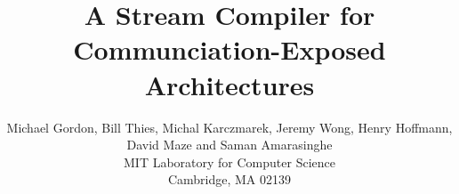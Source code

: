 
\title{A Stream Compiler for Communciation-Exposed Architectures}

\author{Michael Gordon, Bill Thies, Michal Karczmarek, Jeremy Wong,
        Henry Hoffmann, David Maze and Saman Amarasinghe\\
	MIT Laboratory for Computer Science\\
	Cambridge, MA  02139\\
	}


\sloppy




\maketitle

\begin{abstract}

\end{abstract}

%

%
%
%

%
%


